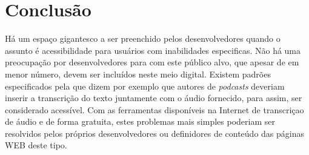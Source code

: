 \documentclass[
	12pt,				%
	oneside,			%
	a4paper,			%
	english,			%
	brazil				%
	]{abntex2ppgsi}
\begin{document}
\chapter{Conclusão}

Há um espaço gigantesco a ser preenchido pelos desenvolvedores quando o assunto é acessibilidade para usuários com inabilidades especificas. Não há uma preocupação por desenvolvedores para com este público alvo, que apesar de em menor número, devem ser incluídos neste meio digital. Existem padrões especificados pela  que dizem por exemplo que autores de \textit{podcasts} deveriam inserir a transcrição do texto juntamente com o áudio fornecido, para assim, ser considerado acessível. Com as ferramentas disponíveis na Internet de transcriçao de áudio e de forma gratuita, estes problemas mais simples poderiam ser resolvidos pelos próprios desenvolvedores ou definidores de conteúdo das páginas WEB deste tipo.



\postextual




\end{document}
